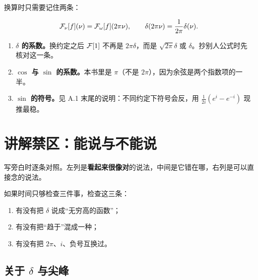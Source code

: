 换算时只需要记住两条：

\begin{equation}
\mathcal{F}_\nu[f](\nu)=\mathcal{F}_\omega[f](2\pi\nu),
\qquad
\delta(2\pi\nu)=\frac{1}{2\pi}\delta(\nu).
\end{equation}

\begin{warnbox}[最容易出错的三处]
\begin{enumerate}[leftmargin=1.4em,itemsep=0.3em]
\item \textbf{$\delta$ 的系数。}换约定之后 $\mathcal{F}[1]$ 不再是 $2\pi\delta$，而是 $\sqrt{2\pi}\delta$ 或 $\delta$。抄别人公式时先核对这一条。
\item \textbf{$\cos$ 与 $\sin$ 的系数。}本书里是 $\pi$（不是 $2\pi$），因为余弦是两个指数项的一半。
\item \textbf{$\sin$ 的符号。}见 A.1 末尾的说明：不同约定下符号会反，用 $\frac{1}{2i}(e^{i}-e^{-i})$ 现推最稳。
\end{enumerate}
\end{warnbox}

\chapter{讲解禁区：能说与不能说}

\begin{ideabox}[怎么用这一章]
写旁白时逐条对照。左列是\textbf{看起来很像对}的说法，中间是它错在哪，右列是可以直接念的说法。

如果时间只够检查三件事，检查这三条：
\begin{enumerate}[leftmargin=1.6em,itemsep=0.2em]
\item 有没有把 $\delta$ 说成“无穷高的函数”；
\item 有没有把“趋于”混成一种；
\item 有没有把 $2\pi$、$i$、负号互换过。
\end{enumerate}
\end{ideabox}

\section{关于 $\delta$ 与尖峰}

